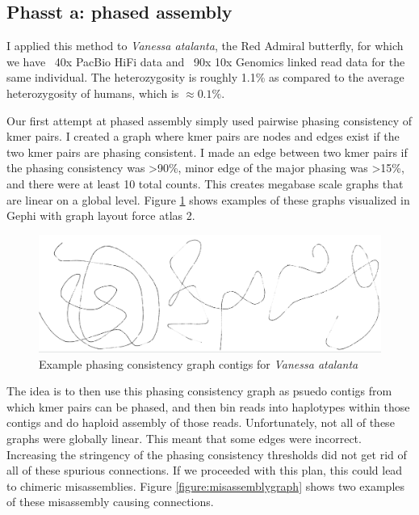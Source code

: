{\subsection{Phasst a: phased assembly}

\par{
I applied this method to \textit{Vanessa atalanta}, the Red Admiral butterfly, for which we have ~40x PacBio HiFi data and ~90x 10x Genomics linked read data for the same individual. The heterozygosity is roughly 1.1\% as compared to the average heterozygosity of humans, which is $\approx0.1\%$.
} 

\par{
Our first attempt at phased assembly simply used pairwise phasing consistency of kmer pairs. I created a graph where kmer pairs are nodes and edges exist if the two kmer pairs are phasing consistent. I made an edge between two kmer pairs if the phasing consistency was >90\%, minor edge of the major phasing was >15\%, and there were at least 10 total counts. This creates megabase scale graphs that are linear on a global level. Figure \ref{figure:phasegraph} shows examples of these graphs visualized in Gephi with graph layout force atlas 2\cite{gephi}\cite{forceatlas2}. 
}

\begin{figure}[htbp!]
\caption{Example phasing consistency graph contigs for \textit{Vanessa atalanta}}
\label{figure:phasegraph}
\begin{centering}
\includegraphics[width=\textwidth]{phasinggraph.png}
\end{centering}
\end{figure}

\par{
The idea is to then use this phasing consistency graph as psuedo contigs from which kmer pairs can be phased, and then bin reads into haplotypes within those contigs and do haploid assembly of those reads. Unfortunately, not all of these graphs were globally linear. This meant that some edges were incorrect. Increasing the stringency of the phasing consistency thresholds did not get rid of all of these spurious connections. If we proceeded with this plan, this could lead to chimeric misassemblies. Figure \ref{figure:misassemblygraph} shows two examples of these misassembly causing connections.
}

}
